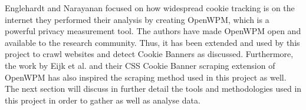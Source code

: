 \documentclass[../main.tex]{subfiles}
\begin{document}
Englehardt and Narayanan focused on how widespread cookie tracking is on the internet they performed their analysis by creating OpenWPM, which is a powerful privacy measurement tool. The authors have made OpenWPM open and available to the research community. Thus, it has been extended and used by this project to crawl websites and detect Cookie Banners as discussed. Furthermore, the work by Eijk et al. and their CSS Cookie Banner scraping extension of OpenWPM has also inspired the scraping method used in this project as well. The next section will discuss in further detail the tools and methodologies used in this project in order to gather as well as analyse data. 
\end{document}
